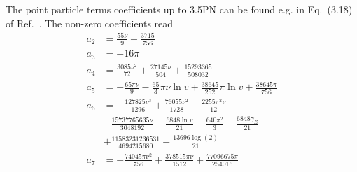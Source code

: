 \documentclass[prd,aps,letter,twocolumn,floatfix,notitlepage,nofootinbib]{revtex4-1}
\begin{document}
The point particle terms coefficients up to 3.5PN can be found e.g. in Eq.~(3.18) of Ref.~\cite{BuonannoIyerOchsner2009}. The non-zero coefficients read
\begin{align}
	a_{2} &= \frac{55 \nu }{9}+\frac{3715}{756} \nonumber\\
	a_{3} &= -16 \pi \nonumber\\
	a_{4} &= \frac{3085 \nu ^2}{72}+\frac{27145 \nu }{504}+\frac{15293365}{508032} \nonumber\\
	a_{5} &= -\frac{65 \pi  \nu }{9}-\frac{65}{3} \pi  \nu   \ln v +\frac{38645}{252} \pi   \ln v +\frac{38645 \pi }{756} \nonumber\\
	a_{6} &= -\frac{127825 \nu ^3}{1296}+\frac{76055 \nu ^2}{1728}+\frac{2255 \pi ^2 \nu }{12} \nonumber\\ 
	& -\frac{15737765635 \nu }{3048192}-\frac{6848  \ln v }{21}-\frac{640 \pi ^2}{3}-\frac{6848 \gamma_{E} }{21} \nonumber\\ 
	& +\frac{11583231236531}{4694215680}-\frac{13696 \log (2)}{21} \nonumber\\
	a_{7} &= -\frac{74045 \pi  \nu ^2}{756}+\frac{378515 \pi  \nu }{1512}+\frac{77096675 \pi }{254016}
\end{align}
\end{document}
